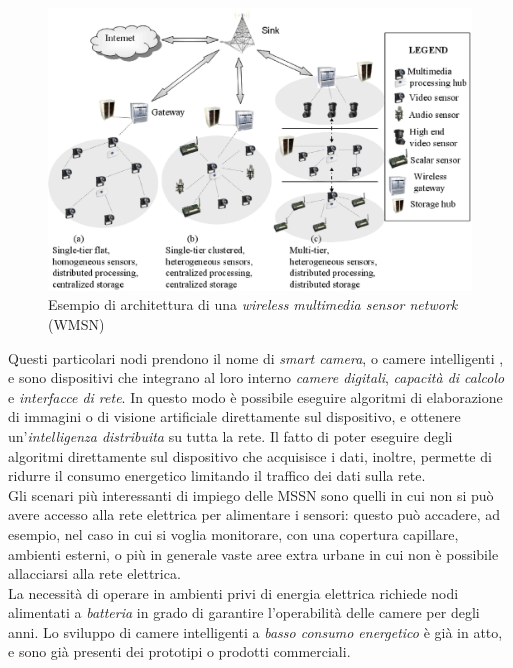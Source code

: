 \begin{figure}
\centering
\includegraphics[width=13cm]{pictures/WMSN}
\caption[Esempio di WMSN]{Esempio di architettura di una \textit{wireless multimedia sensor network} (WMSN)}
\label{fig:WMSN}
\end{figure}
Questi particolari nodi prendono il nome di \textit{smart camera}, o camere intelligenti \cite{wolf2002smart}, e sono dispositivi che integrano al loro interno \textit{camere digitali}, \textit{capacit\`a di calcolo} e \textit{interfacce di rete}.
In questo modo \`e possibile eseguire algoritmi di elaborazione di immagini o di visione artificiale direttamente sul dispositivo, e ottenere un'\textit{intelligenza distribuita} su tutta la rete.
Il fatto di poter eseguire degli algoritmi direttamente sul dispositivo che acquisisce i dati, inoltre, permette di ridurre il consumo energetico limitando il traffico dei dati sulla rete.\\
Gli scenari pi\`u interessanti di impiego delle MSSN sono quelli in cui non si pu\`o avere accesso alla rete elettrica per alimentare i sensori: questo pu\`o accadere, ad esempio, nel caso in cui si voglia monitorare, con una copertura capillare, ambienti esterni, o pi\`u in generale vaste aree extra urbane in cui non \`e possibile allacciarsi alla rete elettrica.\\
La necessit\`a di operare in ambienti privi di energia elettrica richiede nodi alimentati a \textit{batteria} in grado di garantire l'operabilit\`a delle camere per degli anni.
%
Lo sviluppo di camere intelligenti a \textit{basso consumo energetico} \`e gi\`a in atto, e sono gi\`a presenti dei prototipi o prodotti commerciali.
